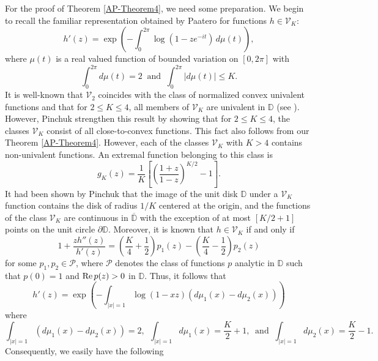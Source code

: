 \documentclass[a4paper,12pt]{amsart}
\theoremstyle{definition}
\newcounter {own}
\begin{document}
For the proof of Theorem \ref{AP-Theorem4}, we need some preparation. We begin to recall
 the familiar representation obtained by Paatero \cite{Paa1} for functions $h\in {\mathcal V}_K$:
\begin{equation}\label{sec2-eq1a}
 h'(z)=\exp\left(-\int_0^{2\pi}\log(1-ze^{-it})\,d\mu(t)\right),
\end{equation}
where $\mu(t)$ is a real valued function of bounded variation on $[0,2\pi]$ with
\begin{equation}\label{sec2-eq1aa}
\int_0^{2\pi} d\mu (t)=2 ~\mbox{ and }~ \int_0^{2\pi}|d\mu (t)|\le K .
\end{equation}
It is well-known that ${\mathcal V}_2$ coincides with the class of normalized convex univalent functions and that
for $2\leq K \leq 4$, all members of ${\mathcal V}_K$ are univalent in ${{\mathbb D}}$ (see \cite{Paa1}).
However, Pinchuk \cite{Pin1} strengthen this result by showing that for $2\leq K \leq 4$, the classes ${\mathcal V}_K$
consist of all close-to-convex functions. This fact also follows from our Theorem \ref{AP-Theorem4}.
However, each of the classes ${\mathcal V}_K$ with $K>4$ contains non-univalent functions.
An extremal function belonging to this class is
\begin{equation}\label{sec2-eq2}
g_K(z)=\frac{1}{K}\left[\left(\frac{1+z}{1-z}\right)^{K/2}-1\right] .
\end{equation}
It had been shown by Pinchuk \cite[Theorem~6.2]{Pin2} that the image of the unit disk ${{\mathbb D}}$ under a ${\mathcal V}_K$ function
contains the disk of radius $1/K$ centered at the origin, and the functions of the class ${\mathcal V}_K$ are
continuous in $\overline{{\mathbb D}}$ with the exception of at most $[K/2+1]$ points on the unit circle $\partial {{\mathbb D}}$.
Moreover, it is known that $h\in {\mathcal V}_K$ if and only if
$$1+\frac{zh''(z)}{h'(z)}=\left (\frac{K}{4}+\frac{1}{2} \right )p_1(z) -\left (\frac{K}{4}-\frac{1}{2} \right )p_2(z)
$$
for some $p_1,p_2\in {\mathcal P}$, where ${\mathcal P}$ denotes the class of functions
$p$ analytic in ${{\mathbb D}}$ such that $p(0)=1$ and ${\rm Re}\, p(z)>0$ in ${{\mathbb D}}$. Thus, it follows that
\begin{equation*}
h'(z)=\exp \left ( -\int_{|x|=1} \log (1-xz)\left( d\mu _{1}(x)-d\mu _{2}(x)\right)\right )
\end{equation*}
where
$$\int _{|x|=1}\left( d\mu _{1}(x)-d\mu _{2}(x)\right) =2, ~~\int _{|x|=1} d\mu _{1}(x)=\frac{K}{2}+1, ~\mbox{ and }~
\int_{|x|=1} d\mu _{2}(x)=\frac{K}{2}-1.
$$
Consequently, we easily have the following
\end{document}
